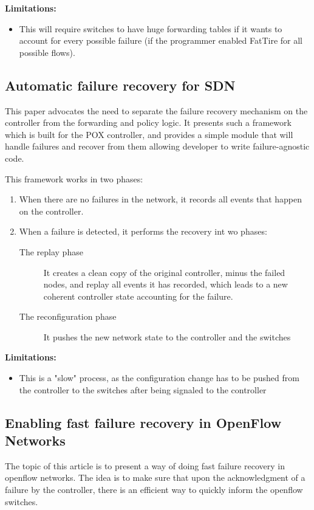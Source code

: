 \documentclass[11pt,a4paper]{article}
\begin{document}
\textbf{Limitations:}
\begin{itemize}
	\item This will require switches to have huge forwarding tables if it wants to account for every possible failure (if the programmer enabled FatTire for all possible flows).
\end{itemize}

\subsection{Automatic failure recovery for SDN}
This paper advocates the need to separate the failure recovery mechanism on the controller from the forwarding and policy logic. It presents such a framework which is built for the POX controller, and provides a simple module that will handle failures and recover from them allowing developer to write failure-agnostic code.

This framework works in two phases:
\begin{enumerate}
	\item When there are no failures in the network, it records all events that happen on the controller.
	\item When a failure is detected, it performs the recovery int wo phases:
		\begin{description}
			\item[The replay phase] It creates a clean copy of the original controller, minus the failed nodes, and replay all events it has recorded, which leads to a new coherent controller state accounting for the failure.
			\item[The reconfiguration phase] It pushes the new network state to the controller and the switches
		\end{description}
\end{enumerate}

\textbf{Limitations:}
\begin{itemize}
	\item This is a "slow" process, as the configuration change has to be pushed from the controller to the switches after being signaled to the controller
\end{itemize}

\subsection{Enabling fast failure recovery in OpenFlow Networks}
The topic of this article is to present a way of doing fast failure recovery in openflow networks.
The idea is to make sure that upon the acknowledgment of a failure by the controller, there is an efficient way to quickly inform the openflow switches.
\end{document}
